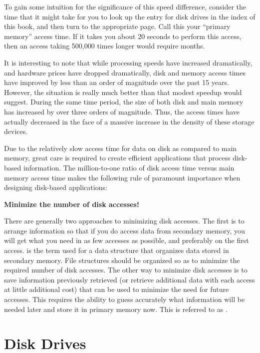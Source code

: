 To gain some intuition for the significance of this speed difference,
consider the time that it might take for you to look up the entry for
disk drives in the index of this book, and then turn to the
appropriate page.
Call this your ``primary memory'' access time.
If it takes you about 20 seconds to perform this access, then
an access taking 500,000 times longer would require
months.

It is interesting to note that while processing speeds have increased
dramatically, and hardware prices have dropped dramatically, disk
and memory access times have improved by less than an order of magnitude
over the past 15 years.
However, the situation is really much better than that modest speedup
would suggest.
During the same time period, the size of both disk and 
main memory has increased by over three orders of magnitude.
Thus, the access times have actually decreased in the face of a
massive increase in the density of these storage devices.

Due to the relatively slow access time for data on disk as compared to 
main memory, great care is required to create efficient applications
that process disk-based information.
The million-to-one ratio of disk access time versus main memory access
time makes the following rule of paramount importance when designing
disk-based applications:

\begin{center}
{\bf Minimize the number of disk accesses!}
\end{center}

There are generally two approaches to minimizing disk accesses.
The first is to arrange information so that if you do access data from
secondary memory, you will get what you need in as few
accesses as possible, and preferably on the first access.
 is the term used for a
data structure that organizes data stored in secondary memory.
File structures should be organized so as to minimize the required
number of disk accesses.
The other way to minimize disk accesses is to save information
previously retrieved (or retrieve additional data with each access at
little additional cost) that can be used to
minimize the need for future accesses.
This requires the ability to guess accurately
what information will be needed later and store it in primary memory
now.
This is referred to as .

\section {Disk Drives}
\label{DDrive}

